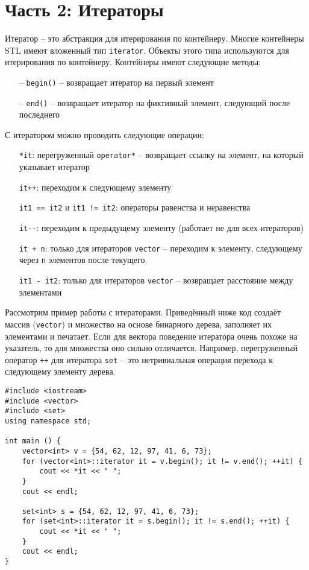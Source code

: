 \documentclass{article}
\begin{document}
\section*{Часть 2: Итераторы}
Итератор -- это абстракция для итерирования по контейнеру. Многие контейнеры STL имеют вложенный тип \texttt{iterator}. Объекты этого типа используются для итерирования по контейнеру. Контейнеры имеют следующие методы:
\begin{itemize}
\item[--] \texttt{begin()} -- возвращает итератор на первый элемент
\item[--] \texttt{end()}  -- возвращает итератор на фиктивный элемент, следующий после последнего
\end{itemize}
С итератором можно проводить следующие операции:
\begin{itemize}
\item[] \texttt{*it}: перегруженный \texttt{operator*} -- возвращает ссылку на элемент, на который указывает итератор
\item[] \texttt{it++}: переходим к следующему элементу
\item[] \texttt{it1 == it2} и \texttt{it1 != it2}:  операторы равенства и неравенства
\item[] \texttt{it-{}-}: переходим к предыдущему элементу (работает не для всех итераторов)
\item[] \texttt{it + n}: только для итераторов \texttt{vector} -- переходим к элементу, следующему через \texttt{n} элементов после текущего.
\item[] \texttt{it1 - it2}: только для итераторов \texttt{vector} -- возвращает расстояние между элементами
\end{itemize}

Рассмотрим пример работы с итераторами. Приведённый ниже код создаёт массив (\texttt{vector}) и множество на основе бинарного дерева, заполняет их элементами и печатает. Если для вектора поведение итератора очень похоже на указатель, то для множества оно сильно отличается. Например, перегруженный оператор \texttt{++} для итератора \texttt{set} -- это нетривиальная операция перехода к следующему элементу дерева.
\begin{lstlisting}
#include <iostream>
#include <vector>
#include <set>
using namespace std;

int main () {
    vector<int> v = {54, 62, 12, 97, 41, 6, 73};
    for (vector<int>::iterator it = v.begin(); it != v.end(); ++it) {
        cout << *it << " ";
    }
    cout << endl;
    
    set<int> s = {54, 62, 12, 97, 41, 6, 73};
    for (set<int>::iterator it = s.begin(); it != s.end(); ++it) {
        cout << *it << " ";
    }
    cout << endl;
}
\end{lstlisting}
\end{document}
